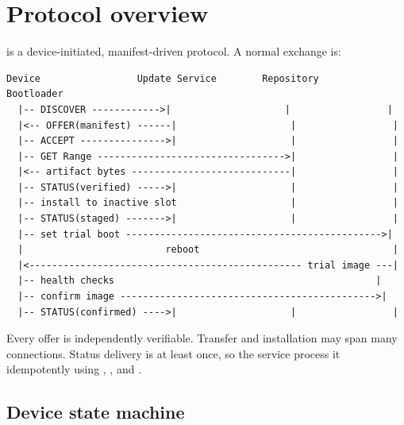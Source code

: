 \section{Protocol overview}

\protocol is a device-initiated, manifest-driven protocol. A normal exchange is:

\begin{lstlisting}
Device                 Update Service        Repository        Bootloader
  |-- DISCOVER ------------>|                    |                 |
  |<-- OFFER(manifest) ------|                    |                 |
  |-- ACCEPT --------------->|                    |                 |
  |-- GET Range --------------------------------->|                 |
  |<-- artifact bytes ----------------------------|                 |
  |-- STATUS(verified) ----->|                    |                 |
  |-- install to inactive slot                    |                 |
  |-- STATUS(staged) ------->|                    |                 |
  |-- set trial boot --------------------------------------------->|
  |                         reboot                                  |
  |<------------------------------------------------ trial image ---|
  |-- health checks                                              |
  |-- confirm image --------------------------------------------->|
  |-- STATUS(confirmed) ---->|                    |                 |
\end{lstlisting}

Every offer is independently verifiable. Transfer and installation may span many
connections. Status delivery is at least once, so the service \must process it
idempotently using , , and .

\subsection{Device state machine}
\label{sec:state-machine}

